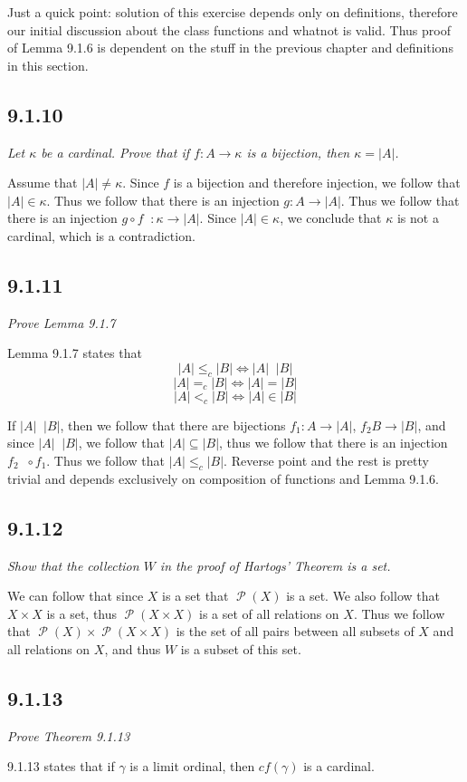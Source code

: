 \documentclass[11pt,oneside,titlepage]{book}
\DeclareMathOperator \pow {\mathcal {P}}
\DeclareMathOperator \inv {^{-1}}
\DeclareMathOperator \lra {\Leftrightarrow}
\DeclareMathOperator \ineq {\underline{\in}}
\begin{document}
Just a quick point: solution of this exercise depends only on definitions, therefore
our initial discussion about the class functions and whatnot is valid.
Thus proof of Lemma 9.1.6 is dependent on the stuff in the previous chapter and definitions
in this section.

\subsection*{9.1.10}

\textit{Let $\kappa$ be a cardinal. Prove that if $f: A \to \kappa$ is a bijection,
  then $\kappa = |A|$.}

Assume that $|A| \neq \kappa$. Since $f$ is a bijection and therefore
injection, we follow that $|A| \in \kappa$. Thus we follow that there is an injection
$g: A \to |A|$. Thus we follow that there is an injection $g \circ f\inv: \kappa \to |A|$.
Since $|A| \in \kappa$, we conclude that $\kappa$ is not a cardinal, which is
a contradiction.

\subsection*{9.1.11}

\textit{Prove Lemma 9.1.7}

Lemma 9.1.7 states that
$$|A| \leq_c |B| \lra |A| \ineq |B|$$
$$|A| =_c |B| \lra |A| = |B|$$
$$|A| <_c |B| \lra |A| \in |B|$$

If $|A| \ineq |B|$, then we follow that there are bijections $f_1 : A \to |A|$, $f_2 B \to |B|$,
and since $|A| \ineq |B|$, we follow that $|A| \subseteq |B|$, thus we follow that there is
an injection $ f_2\inv \circ f_1$. Thus we follow that $|A| \leq_c |B|$. Reverse point and
the rest is pretty trivial and depends exclusively on composition of functions and Lemma 9.1.6.

\subsection*{9.1.12}

\textit{Show that the collection $W$ in the proof of Hartogs' Theorem is a set.}

We can follow that since $X$ is a set that $\pow(X)$ is a set. We also follow that $X \times X$
is a set, thus $\pow(X \times X)$ is a set of all relations on $X$. Thus we follow that
$\pow(X) \times \pow(X \times X)$ is the set of all pairs between all subsets of $X$ and
all relations on $X$, and thus $W$ is a subset of this set.

\subsection*{9.1.13}

\textit{Prove Theorem 9.1.13}

9.1.13 states that if $\gamma$ is a limit ordinal, then  $cf(\gamma)$ is a cardinal.
\end{document}
